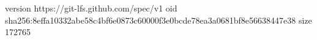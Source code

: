 version https://git-lfs.github.com/spec/v1
oid sha256:8effa10332abe58c4bf6e0873c60000f3e0bcde78ea3a0681bf8e56638447e38
size 172765
